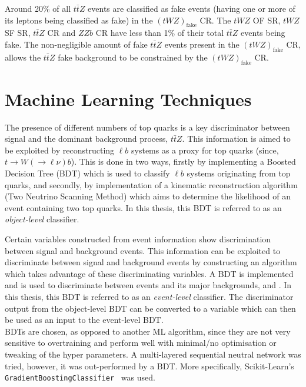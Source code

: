 Around 20$\%$ of all $t\bar{t}Z$ events are classified as fake events (having one or more of its leptons being classified as fake) in the $(tWZ)_{\text{fake}}$ CR. The $tWZ$ OF SR, $tWZ$ SF SR, $t\bar{t}Z$ CR and $ZZb$ CR have less than 1$\%$ of their total $t\bar{t}Z$ events being fake. The non-negligible amount of fake $t\bar{t}Z$ events present in the $(tWZ)_{\text{fake}}$ CR, allows the $t\bar{t}Z$ fake background to be constrained by the $(tWZ)_{\text{fake}}$ CR.


\section{Machine Learning Techniques}
The presence of different numbers of top quarks is a key discriminator between signal and the dominant background process, $t\bar{t}Z$. This information is aimed to be exploited by reconstructing $\ell b$ systems as a proxy for top quarks (since, $t\rightarrow W(\rightarrow \ell \nu) b$). This is done in two ways, firstly by implementing a Boosted Decision Tree (BDT) which is used to classify $\ell b$ systems originating from top quarks, and secondly, by implementation of a kinematic reconstruction algorithm (Two Neutrino Scanning Method) which aims to determine the likelihood of an event containing two top quarks. In this thesis, this BDT is referred to as an \textit{object-level} classifier. 

Certain variables constructed from event information show discrimination between signal and background events. This information can be exploited to discriminate between signal and background events by constructing an algorithm which takes advantage of these discriminating variables. A BDT is implemented and is used to discriminate between \tWZ events and its major backgrounds, \ttZ and \ZZ. In this thesis, this BDT is referred to as an \textit{event-level} classifier. The discriminator output from the object-level BDT can be converted to a variable which can then be used as an input to the event-level BDT.\\

BDTs are chosen, as opposed to another ML algorithm, since they are not very sensitive to overtraining and perform well with minimal/no optimisation or tweaking of the hyper parameters. A multi-layered sequential neutral network was tried, however, it was out-performed by a BDT. More specifically, Scikit-Learn's \texttt{GradientBoostingClassifier}~\cite{scikit-bdt} was used.
